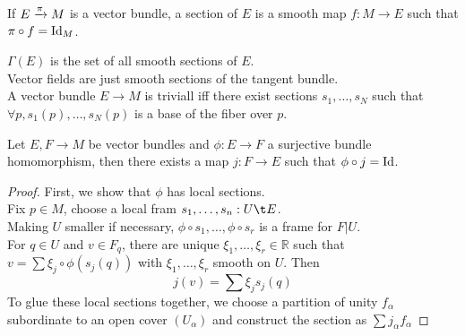 \documentclass[../main.tex]{subfiles}
\begin{document}
\begin{defn}[section]
	If $E\xrightarrow{\pi} M$ is a vector bundle, a section of $E$ is a smooth map $f:M\to E$ such that $\pi\circ f = \operatorname{Id}_M$.
\end{defn}
$\Gamma( E) $ is the set of all smooth sections of $E$.\\
Vector fields are just smooth sections of the tangent bundle.\\
A vector bundle $E\to M$ is triviall iff there exist sections $s_1,\ldots,s_N$ such that $\forall p, s_1( p),\ldots,s_N( p) $ is a base of the fiber over $p$.\\
\begin{propo}
Let $E,F\to M$ be vector bundles and $\phi:E\to F$  a surjective bundle homomorphism, then there exists a map $j:F\to E$ such that $\phi\circ j = \operatorname{Id}$.\\
\end{propo}
\begin{proof}
First, we show that $\phi$ has local sections.\\
Fix $p\in M$, choose a local fram $s_1,\ldots,s_n:U\t E$.\\
Making $U$ smaller if necessary, $\phi\circ s_1,\ldots,\phi\circ s_r$ is a frame for $F|U$.\\
For $q\in U$ and $v\in F_q$, there are unique $\xi_1,\ldots,\xi_r\in \mathbb{R}$ such that $v= \sum \xi_j \circ\phi( s_j( q) ) $ with $\xi_1,\ldots,\xi_r$ smooth on $U$.
Then
\[ 
j( v) = \sum \xi_j s_j( q) 
\]
To glue these local sections together, we choose a partition of unity $f_\alpha$  subordinate to an open cover $( U_\alpha) $ and construct the section as $\sum j_\alpha f_\alpha$
\end{proof}
\end{document}
